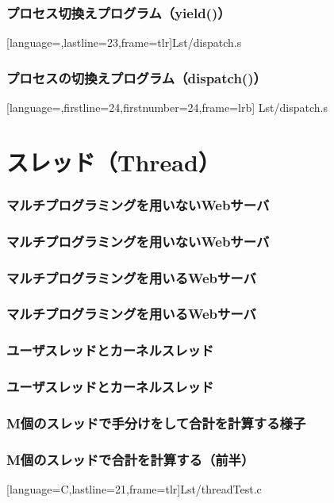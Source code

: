 \documentclass{beamer}                   %
\begin{document}
\begin{frame}[fragile]
  \frametitle{プロセス切換えプログラム（yield()）}
  
      [language=,lastline=23,frame=tlr]{Lst/dispatch.s}
\end{frame}

\begin{frame}[fragile]
  \frametitle{プロセスの切換えプログラム（dispatch()）}
  
      [language=,firstline=24,firstnumber=24,frame=lrb]
      {Lst/dispatch.s}
\end{frame}

\section{スレッド（Thread）}
\begin{frame}
  \frametitle{マルチプログラミングを用いないWebサーバ}
\end{frame}

\begin{frame}
  \frametitle{マルチプログラミングを用いないWebサーバ}
\end{frame}

\begin{frame}
  \frametitle{マルチプログラミングを用いるWebサーバ}
\end{frame}

\begin{frame}
  \frametitle{マルチプログラミングを用いるWebサーバ}
\end{frame}

\begin{frame}
  \frametitle{ユーザスレッドとカーネルスレッド}
\end{frame}

\begin{frame}
  \frametitle{ユーザスレッドとカーネルスレッド}
\end{frame}

\begin{frame}
  \frametitle{M個のスレッドで手分けをして合計を計算する様子}
\end{frame}

\begin{frame}[fragile]
  \frametitle{M個のスレッドで合計を計算する（前半）}
  
      [language={C},lastline=21,frame=tlr]{Lst/threadTest.c}
\end{frame}
\end{document}
